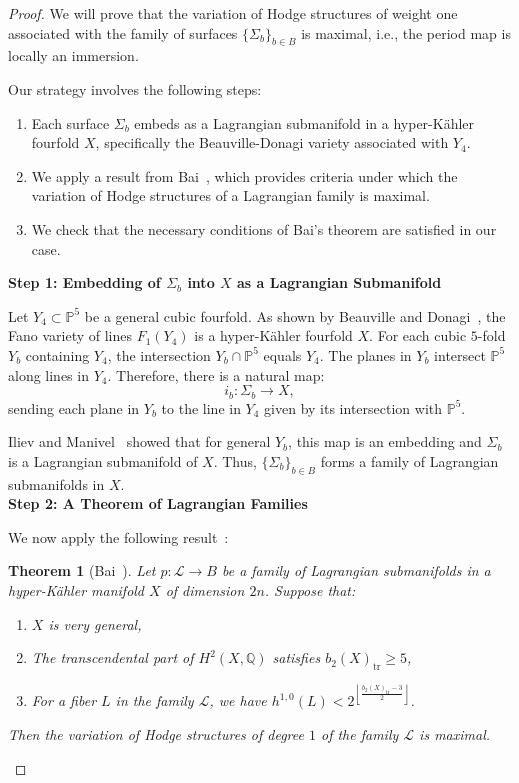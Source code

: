 \documentclass{article}
\newtheorem{theorem}{Theorem}[section]
\theoremstyle{definition}
\begin{document}
\begin{proof}
We will prove that the variation of Hodge structures of weight one associated with the family of surfaces $\{\Sigma_b\}_{b \in B}$ is maximal, i.e., the period map is locally an immersion.

Our strategy involves the following steps:

\begin{enumerate}
    \item Each surface $\Sigma_b$ embeds as a Lagrangian submanifold in a hyper-Kähler fourfold $X$, specifically the Beauville-Donagi variety associated with $Y_4$.
    \item We apply a result from Bai~\cite[Proposition 2]{Bai}, which provides criteria under which the variation of Hodge structures of a Lagrangian family is maximal.
    \item We check that the necessary conditions of Bai's theorem are satisfied in our case.
\end{enumerate}
\textbf{Step 1: Embedding of $\Sigma_b$ into $X$ as a Lagrangian Submanifold}

Let $Y_4 \subset \mathbb{P}^5$ be a general cubic fourfold. As shown by Beauville and Donagi~\cite{BD}, the Fano variety of lines $F_1(Y_4)$ is a hyper-Kähler fourfold $X$. For each cubic $5$-fold $Y_b$ containing $Y_4$, the intersection $Y_b \cap \mathbb{P}^5$ equals $Y_4$. The planes in $Y_b$ intersect $\mathbb{P}^5$ along lines in $Y_4$. Therefore, there is a natural map:
\[
i_b: \Sigma_b \to X,
\]
sending each plane in $Y_b$ to the line in $Y_4$ given by its intersection with $\mathbb{P}^5$.

Iliev and Manivel~\cite[Proposition 4]{IlievManivel} showed that for general $Y_b$, this map is an embedding and $\Sigma_b$ is a Lagrangian submanifold of $X$. Thus, $\{\Sigma_b\}_{b \in B}$ forms a family of Lagrangian submanifolds in $X$.\\
\textbf{Step 2: A Theorem of Lagrangian Families}

We now apply the following result~\cite[Proposition 2]{Bai}:

\begin{theorem}[Bai~\cite{Bai}]\label{ThmBai}
Let $p: \mathcal{L} \to B$ be a family of Lagrangian submanifolds in a hyper-Kähler manifold $X$ of dimension $2n$. Suppose that:
\begin{enumerate}
    \item $X$ is very general,
    \item The transcendental part of $H^2(X, \mathbb{Q})$ satisfies $b_2(X)_{\mathrm{tr}} \geq 5$,
    \item For a fiber $L$ in the family $\mathcal{L}$, we have $h^{1, 0}(L) < 2^{\left\lfloor \frac{b_2(X)_{\mathrm{tr}} - 3}{2} \right\rfloor}$.
\end{enumerate}
Then the variation of Hodge structures of degree $1$ of the family $\mathcal{L}$ is maximal.
\end{theorem}


\end{proof}
\end{document}
